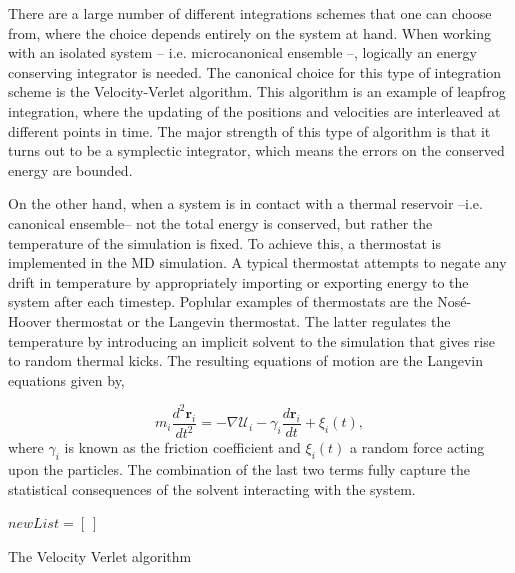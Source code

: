 \noindent There are a large number of different integrations schemes that one can choose
from, where the choice depends entirely on the system at hand.
When working with an isolated system -- i.e. microcanonical ensemble --, logically an
energy conserving integrator is needed. The canonical
choice for this type of integration scheme is the Velocity-Verlet algorithm. This
algorithm is an example of leapfrog integration, where the updating of the positions
and velocities are interleaved at different points in time. The major strength of this
type of algorithm is that it turns out to be a symplectic integrator, which means the
errors on the conserved energy are bounded.

On the other hand, when a system is in contact with a thermal reservoir --i.e. canonical
ensemble-- not the total energy is conserved, but rather the temperature of the
simulation is fixed. To achieve this, a thermostat is implemented in the MD
simulation. A typical thermostat attempts to negate any drift in temperature by
appropriately importing or exporting energy to the system after each timestep.
Poplular examples of thermostats are the Nos\'e-Hoover thermostat or the Langevin
thermostat.  The latter regulates the temperature by introducing an implicit solvent to
the simulation that gives rise to random thermal kicks. The resulting equations of motion
are the Langevin equations given by,

\begin{equation}
    m_i \frac{d^2 \boldsymbol{r}_i}{dt^2} = - \nabla \mathcal{U}_i - \gamma_i \frac{d
    \boldsymbol{r}_i}{d t} +
    \xi_i(t),
\end{equation}
where $\gamma_i$ is known  as the friction coefficient and $\xi_i(t)$ a random force
acting upon the particles. The combination of the last two terms fully capture the
statistical consequences of the solvent interacting with the system.


\begin{algorithm}


    $newList = [\ ]$



    \caption{The Velocity Verlet algorithm}
\end{algorithm}

